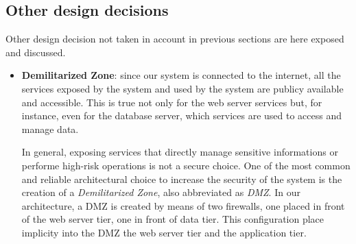 \subsection{Other design decisions}

\label{sec:other-design-decisions}

Other design decision not taken in account in previous sections are here exposed and discussed.

\begin{itemize}
	\item \textbf{Demilitarized Zone}: since our system is connected to the internet, all the services exposed by the system and used by the system are publicy available and accessible. This is true not only for the web server services but, for instance, even for the database server, which services are used to access and manage data. 

In general, exposing services that directly manage sensitive informations or performe high-risk operations is not a secure choice. One of the most common and reliable architectural choice to increase the security of the system is the creation of a \textit{Demilitarized Zone}, also abbreviated as \textit{DMZ}. In our architecture, a DMZ is created by means of two firewalls, one placed in front of the web server tier, one in front of data tier. This configuration place implicity into the DMZ the web server tier and the application tier.
\end{itemize}

